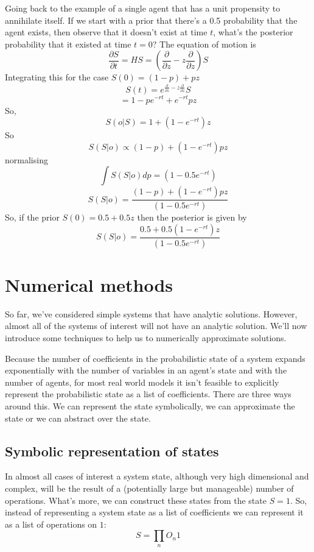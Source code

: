 \documentclass[letterpaper,twocolumn,10pt]{article}
\begin{document}
Going back to the example of a single agent that has a unit propensity to annihilate itself. If we start with a prior that there's a 0.5 probability that the agent exists, then observe that it doesn't exist at time $t$, what's the posterior probability that it existed at time $t=0$? The equation of motion is
\[
\frac{\partial S}{\partial t} = HS = \left(\frac{\partial}{\partial z} - z \frac{\partial }{\partial z}\right)S
\]
Integrating this for the case $S(0) = (1-p) + pz$
\[
S(t) = e^{\frac{\partial}{\partial z} - z \frac{\partial }{\partial z}}S
\]
\[
= 1-pe^{-rt} + e^{-rt}pz
\]
So,
\[
S(o|S) = 1 + (1-e^{-rt})z
\]
So
\[
S(S|o) \propto (1-p) + (1-e^{-rt})pz
\]
normalising
\[
\int S(S|o) dp = (1-0.5e^{-rt})
\]
\[
S(S|o) = \frac{(1-p) + (1-e^{-rt})pz}{(1-0.5e^{-rt})}
\]
So, if the prior $S(0) = 0.5 + 0.5z$ then the posterior is given by
\[
S(S|o) = \frac{0.5 + 0.5(1-e^{-rt})z}{(1-0.5e^{-rt})}
\]

\section{Numerical methods}

So far, we've considered simple systems that have analytic solutions. However, almost all of the systems of interest will not have an analytic solution. We'll now introduce some techniques to help us to numerically approximate solutions.

Because the number of coefficients in the probabilistic state of a system expands exponentially with the number of variables in an agent's state and with the number of agents, for most real world models it isn't feasible to explicitly represent the probabilistic state as a list of coefficients. There are three ways around this. We can represent the state symbolically, we can approximate the state or we can abstract over the state.

\subsection{Symbolic representation of states}

In almost all cases of interest a system state, although very high dimensional and complex, will be the result of a (potentially large but manageable) number of operations. What's more, we can construct these states from the state $S=1$. So, instead of representing a system state as a list of coefficients we can represent it as a list of operations on $1$:
\[
S = \prod_n O_n1
\]
\end{document}
